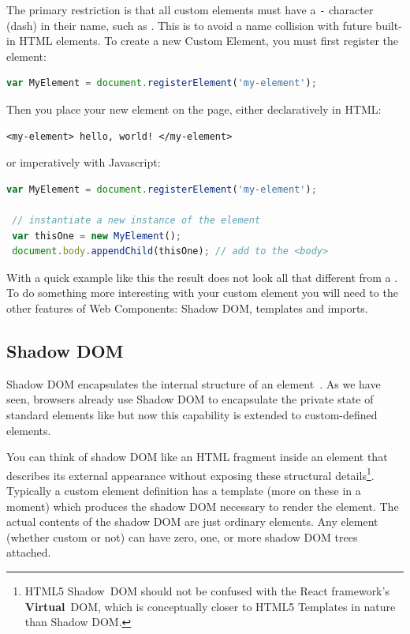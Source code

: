 The primary restriction is that all custom elements must have a \texttt{-} character (dash) in their name, such as . 
This is to avoid a name collision with future built-in HTML elements. 
To create a new Custom Element, you must first register the element:

\begin{lstlisting}[language=JavaScript,numbers=none]
 var MyElement = document.registerElement('my-element');
\end{lstlisting}

Then you place your new element on the page, either declaratively in HTML:

\begin{lstlisting}[language=HTML5,numbers=none]
 <my-element> hello, world! </my-element>
\end{lstlisting}

or imperatively with Javascript:

\begin{lstlisting}[language=JavaScript,numbers=none]
 var MyElement = document.registerElement('my-element');

 // instantiate a new instance of the element
 var thisOne = new MyElement();      
 document.body.appendChild(thisOne); // add to the <body>
\end{lstlisting}

With a quick example like this the result does not look all that different from a .
To do something more interesting with your custom element you will need to the other features of Web Components: Shadow DOM, templates and imports.

\subsection{Shadow DOM}
Shadow DOM encapsulates the internal structure of an element~\cite{w3ccontributors2015}. 
As we have seen, browsers already use Shadow DOM to encapsulate the private state of standard elements like  but now this capability is extended to custom-defined elements.

You can think of shadow DOM like an HTML fragment inside an element that describes its external appearance without exposing these structural details\footnote{
HTML5 Shadow~DOM should not be confused with the React framework's \textbf{Virtual}~DOM, which is conceptually closer to HTML5 Templates in nature than Shadow DOM.}. 
Typically a custom element definition has a template (more on these in a moment) which produces the shadow DOM necessary to render the element.
The actual contents of the shadow DOM are just ordinary elements.
Any element (whether custom or not) can have zero, one, or more shadow DOM trees attached.

